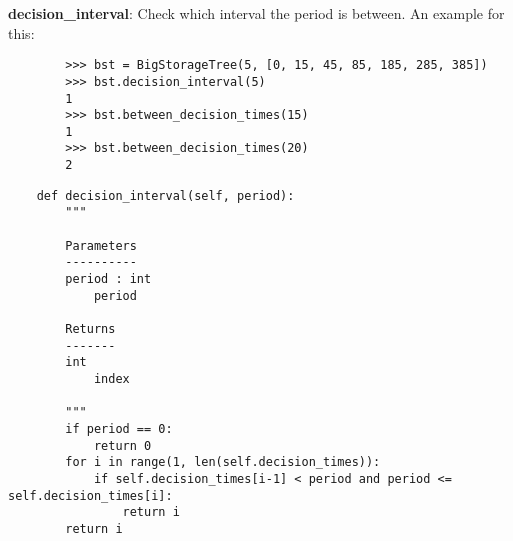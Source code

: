 \documentclass[12pt]{article}
\begin{document}
\textbf{decision\_interval}: Check which interval the period is between. An example for this:
\begin{verbatim}
		>>> bst = BigStorageTree(5, [0, 15, 45, 85, 185, 285, 385])
		>>> bst.decision_interval(5)
		1
		>>> bst.between_decision_times(15)
		1
		>>> bst.between_decision_times(20)
		2
\end{verbatim}
\begin{verbatim}
	def decision_interval(self, period):
		"""
		
		Parameters
		----------
		period : int
			period

		Returns
		-------
		int
			index

		"""
		if period == 0:
			return 0
		for i in range(1, len(self.decision_times)):
			if self.decision_times[i-1] < period and period <= self.decision_times[i]:
				return i
		return i
\end{verbatim}
\end{document}
